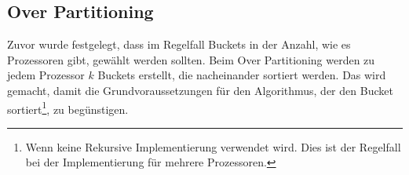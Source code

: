 	\subsection{Over Partitioning}
		Zuvor wurde festgelegt, dass im Regelfall Buckets in der Anzahl, wie es Prozessoren gibt, gewählt werden sollten.
		Beim Over Partitioning werden zu jedem Prozessor $k$ Buckets erstellt, die nacheinander sortiert werden.
		Das wird gemacht, damit die Grundvoraussetzungen für den Algorithmus, der den Bucket sortiert\footnote{Wenn keine Rekursive Implementierung verwendet wird. Dies ist der Regelfall bei der Implementierung für mehrere Prozessoren.}, zu begünstigen.
